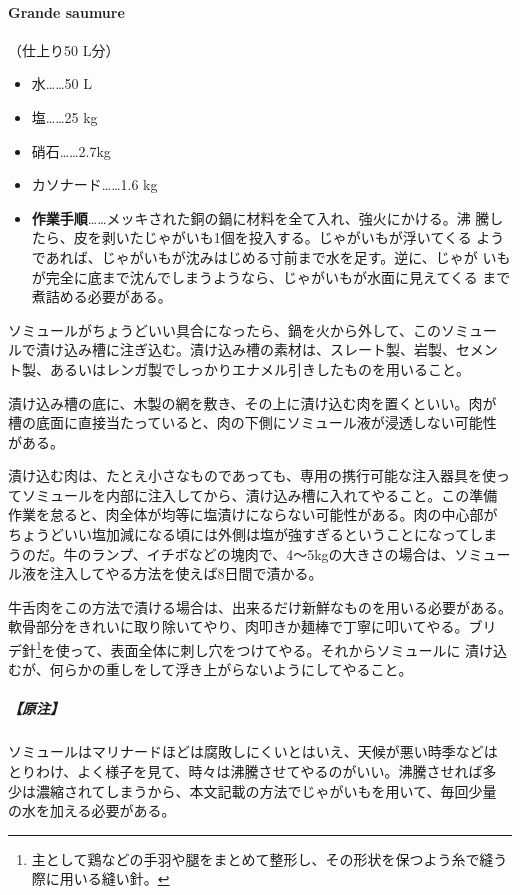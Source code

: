 \begin{recette}
\hypertarget{grande-saumure}{%
\paragraph{Grande saumure}\label{grande-saumure}}


（仕上り50 L分）

\begin{itemize}
\tightlist
\item
  水\ldots{}\ldots{}50 L
\item
  塩\ldots{}\ldots{}25 kg
\item
  硝石\ldots{}\ldots{}2.7kg
\item
  カソナード\ldots{}\ldots{}1.6 kg
\item
  \textbf{作業手順}\ldots{}\ldots{}メッキされた銅の鍋に材料を全て入れ、強火にかける。沸
  騰したら、皮を剥いたじゃがいも1個を投入する。じゃがいもが浮いてくる
  ようであれば、じゃがいもが沈みはじめる寸前まで水を足す。逆に、じゃが
  いもが完全に底まで沈んでしまうようなら、じゃがいもが水面に見えてくる
  まで煮詰める必要がある。
\end{itemize}

ソミュールがちょうどいい具合になったら、鍋を火から外して、このソミュー
ルで漬け込み槽に注ぎ込む。漬け込み槽の素材は、スレート製、岩製、セメン
ト製、あるいはレンガ製でしっかりエナメル引きしたものを用いること。

漬け込み槽の底に、木製の網を敷き、その上に漬け込む肉を置くといい。肉が
槽の底面に直接当たっていると、肉の下側にソミュール液が浸透しない可能性
がある。

漬け込む肉は、たとえ小さなものであっても、専用の携行可能な注入器具を使っ
てソミュールを内部に注入してから、漬け込み槽に入れてやること。この準備
作業を怠ると、肉全体が均等に塩漬けにならない可能性がある。肉の中心部が
ちょうどいい塩加減になる頃には外側は塩が強すぎるということになってしま
うのだ。牛のランプ、イチボなどの塊肉で、4〜5kgの大きさの場合は、ソミュー
ル液を注入してやる方法を使えば8日間で漬かる。

牛舌肉をこの方法で漬ける場合は、出来るだけ新鮮なものを用いる必要がある。
軟骨部分をきれいに取り除いてやり、肉叩きか麺棒で丁寧に叩いてやる。ブリ
デ針\footnote{主として鶏などの手羽や腿をまとめて整形し、その形状を保つよう糸で縫う際に用いる縫い針。}を使って、表面全体に刺し穴をつけてやる。それからソミュールに
漬け込むが、何らかの重しをして浮き上がらないようにしてやること。

\hypertarget{ux539fux6ce8}{%
\subparagraph{【原注】}\label{ux539fux6ce8}}

ソミュールはマリナードほどは腐敗しにくいとはいえ、天候が悪い時季などは
とりわけ、よく様子を見て、時々は沸騰させてやるのがいい。沸騰させれば多
少は濃縮されてしまうから、本文記載の方法でじゃがいもを用いて、毎回少量
の水を加える必要がある。
\end{recette}